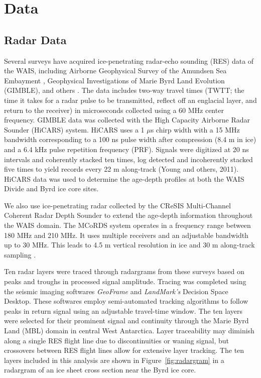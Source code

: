 \documentclass[12pt]{article}
\begin{document}
\section{Data}

\subsection{Radar Data}
Several surveys have acquired ice-penetrating radar-echo sounding (RES) data of the WAIS, including Airborne Geophysical Survey of the Amundsen Sea Embayment \citep[AGASEA,][]{holt2006}, Geophysical Investigations of Marie Byrd Land Evolution (GIMBLE), and others \citep[e.g.][]{bedmap2}. The data includes two-way travel times (TWTT; the time it takes for a radar pulse to be transmitted, reflect off an englacial layer, and return to the receiver) in microseconds collected using a 60 MHz center frequency. GIMBLE data was collected with the High Capacity Airborne Radar Sounder (HiCARS) system. HiCARS uses a 1 $\mu$s chirp width with a 15 MHz bandwidth corresponding to a 100 ns pulse width after compression (8.4 m in ice) and a 6.4 kHz pulse repetition frequency (PRF). Signals were digitized at 20 ns intervals and coherently stacked ten times, log detected and incoherently stacked five times to yield records every 22 m along-track (Young and others, 2011). HiCARS data was used to determine the age-depth profiles at both the WAIS Divide and Byrd ice core sites. %

We also use ice-penetrating radar collected by the CReSIS Multi-Channel Coherent Radar Depth Sounder \citep[MCoRDS;][]{bedmap2} to extend the age-depth information throughout the WAIS domain. The MCoRDS system operates in a frequency range between 180 MHz and 210 MHz. It uses multiple receivers and an adjustable bandwidth up to 30 MHz. This leads to 4.5 m vertical resolution in ice and 30 m along-track sampling \citep{Leuschen2000}.

Ten radar layers were traced through radargrams from these surveys based on peaks and troughs in processed signal amplitude. Tracing was completed using the seismic imaging softwares \textit{GeoFrame} and \textit{LandMark's} Decision Space Desktop. These softwares employ semi-automated tracking algorithms to follow peaks in return signal using an adjustable travel-time window. The ten layers were selected for their prominent signal and continuity through the Marie Byrd Land (MBL) domain in central West Antarctica. Layer traceability may diminish along a single RES flight line due to discontinuities or waning signal, but crossovers between RES flight lines allow for extensive layer tracking. The ten layers included in this analysis are shown in Figure~\ref{fig:radargram} in a radargram of an ice sheet cross section near the Byrd ice core.
\end{document}

